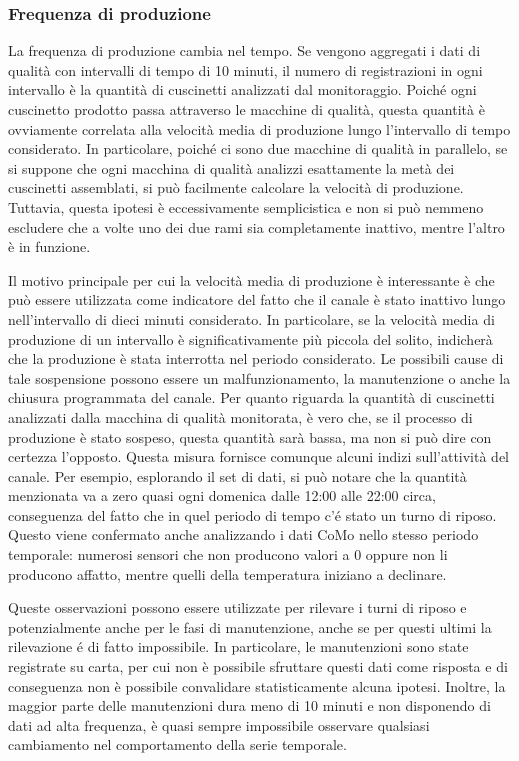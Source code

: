 \subsubsection{Frequenza di produzione}
La frequenza di produzione cambia nel tempo. Se vengono aggregati i dati di qualità con intervalli di tempo di 10 minuti, il numero di registrazioni in ogni intervallo è la quantità di cuscinetti analizzati dal monitoraggio.
Poiché ogni cuscinetto prodotto passa attraverso le macchine di qualità, questa quantità è ovviamente correlata alla velocità media di produzione
lungo l'intervallo di tempo considerato. In particolare, poiché ci sono due macchine di qualità in parallelo, se si suppone che ogni macchina di qualità analizzi esattamente la metà dei cuscinetti assemblati, si può facilmente calcolare la velocità di produzione. Tuttavia, questa ipotesi è eccessivamente semplicistica e non si può nemmeno escludere che a volte uno dei due rami sia completamente inattivo, mentre l'altro è in funzione. 

Il motivo principale per cui la velocità media di produzione è interessante è che può essere utilizzata come indicatore del fatto che il canale è stato inattivo lungo nell'intervallo di dieci minuti considerato. In particolare, se la velocità media di produzione di un intervallo è significativamente più piccola del solito, indicherà che la produzione è stata interrotta nel periodo considerato. Le possibili cause di tale sospensione possono essere un malfunzionamento, la manutenzione o anche la chiusura programmata del canale.
Per quanto riguarda la quantità di cuscinetti analizzati dalla macchina di qualità monitorata, è vero che, se il processo di produzione è stato sospeso, questa quantità sarà bassa, ma non si può dire con certezza l'opposto.
Questa misura fornisce comunque alcuni indizi sull'attività del canale. Per esempio, esplorando il set di dati, si può notare che la quantità menzionata va a zero quasi ogni domenica dalle 12:00 alle 22:00 circa, conseguenza del fatto che in quel periodo di tempo c'é stato un turno di riposo. Questo viene confermato anche analizzando i dati CoMo nello stesso periodo temporale: numerosi sensori che non producono valori a 0 oppure non li producono affatto, mentre quelli della temperatura iniziano a declinare. 

Queste osservazioni possono essere utilizzate per rilevare i turni di riposo e potenzialmente anche per le fasi di manutenzione, anche se per questi ultimi la rilevazione é di fatto impossibile. In particolare, le manutenzioni sono state registrate su carta, per cui non è possibile sfruttare questi dati come risposta e di conseguenza non è possibile convalidare statisticamente alcuna ipotesi.
Inoltre, la maggior parte delle manutenzioni dura meno di 10 minuti e
non disponendo di dati ad alta frequenza, è quasi sempre impossibile
osservare qualsiasi cambiamento nel comportamento della serie temporale. 

